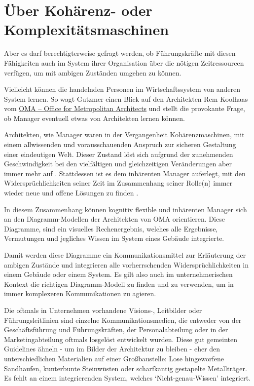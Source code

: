 \documentclass[
  ngerman,
  letterpaper,
  DIV=11]{scrartcl}
\begin{document}
\section{Über Kohärenz- oder
Komplexitätsmaschinen}\label{uxfcber-kohuxe4renz--oder-komplexituxe4tsmaschinen}

Aber es darf berechtigterweise gefragt werden, ob Führungskräfte mit
diesen Fähigkeiten auch im System ihrer Organisation über die nötigen
Zeitressourcen verfügen, um mit ambigen Zuständen umgehen zu können.

Vielleicht können die handelnden Personen im Wirtschaftssystem von
anderen System lernen. So wagt Gutzmer einen Blick auf den Architekten
Rem Koolhaas vom \href{https://www.oma.com}{OMA -- Office for
Metropolitan Architects} und stellt die provokante Frage, ob Manager
eventuell etwas von Architekten lernen können.

Architekten, wie Manager waren in der Vergangenheit Kohärenzmaschinen,
mit einem allwissenden und vorausschauenden Anspruch zur sicheren
Gestaltung einer eindeutigen Welt. Dieser Zustand löst sich aufgrund der
zunehmenden Geschwindigkeit bei den vielfältigen und gleichzeitigen
Veränderungen aber immer mehr auf \autocite[11]{roth2019}. Stattdessen
ist es dem inhärenten Manager auferlegt, mit den Widersprüchlichkeiten
seiner Zeit im Zusammenhang seiner Rolle(n) immer wieder neue und offene
Lösungen zu finden \autocite[102]{gutzmer2020}.

In diesem Zusammenhang können kognitiv flexible und inhärenten Manager
sich an den Diagramm-Modellen der Architekten von OMA orientieren. Diese
Diagramme, sind ein visuelles Rechenergebnis, welches alle Ergebnisse,
Vermutungen und jegliches Wissen im System eines Gebäude integrierte.

Damit werden diese Diagramme ein Kommunikationsmittel zur Erläuterung
der ambigen Zustände und integrieren alle vorherrschenden
Widersprüchlichkeiten in einem Gebäude oder einem System. Es gilt also
auch im unternehmerischen Kontext die richtigen Diagramm-Modell zu
finden und zu verwenden, um in immer komplexeren Kommunikationen zu
agieren.

Die oftmals in Unternehmen vorhandene Visions-, Leitbilder oder
Führungsleitlinien sind einzelne Kommunikationsmedien, die entweder von
der Geschäftsführung und Führungskräften, der Personalabteilung oder in
der Marketingabteilung oftmals losgelöst entwickelt wurden. Diese gut
gemeinten Guidelines ähneln - um im Bilder der Architektur zu bleiben -
eher den unterschiedlichen Materialien auf einer Großbaustelle: Lose
hingeworfene Sandhaufen, kunterbunte Steinwüsten oder scharfkantig
gestapelte Metallträger. Es fehlt an einem integrierenden System,
welches `Nicht-genau-Wissen' integriert.
\end{document}
